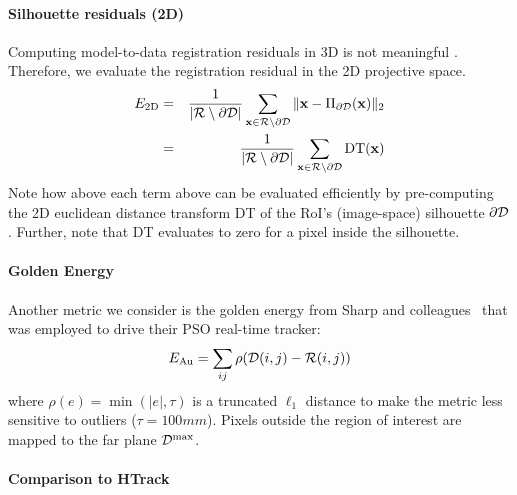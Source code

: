 \paragraph{Silhouette residuals (2D)}
Computing model-to-data registration residuals in 3D is not meaningful . Therefore, we evaluate the registration residual in the 2D projective space. 
\begin{eqnarray}
E_\text{2D} 
&=& \frac{1}{|\mathcal{R} \setminus \partial\mathcal{D}|} 
\sum_{\mathbf{x} \in \mathcal{R} \setminus \partial\mathcal{D}} \| \mathbf{x} - \Pi_{\partial\mathcal{D}}(\mathbf{x}) \|_2 \\ 
&=& \frac{1}{|\mathcal{R} \setminus \partial\mathcal{D}|} 
\sum_{\mathbf{x} \in \mathcal{R} \setminus \partial\mathcal{D}} \text{DT}(\mathbf{x})
\label{eq:metric2}
\end{eqnarray}
Note how above each term above can be evaluated efficiently by pre-computing the 2D euclidean distance transform DT of the RoI's (image-space) silhouette $\partial \mathcal{D}$. Further, note that DT evaluates to zero for a pixel inside the silhouette. 



\paragraph{Golden Energy}
Another metric we consider is the golden energy from Sharp and colleagues~ that was employed to drive their PSO real-time tracker:
\begin{equation}
E_{\text{Au}} = \sum_{ij} \rho(\mathcal{D}(i,j) - \mathcal{R}(i,j))
\label{eq:golden}
\end{equation}
where $\rho(e)=\min(|e|,\tau)$ is a truncated $\ell_1$ distance to make the metric less sensitive to outliers ($\tau=100mm$). Pixels outside the region of interest are mapped to the far plane $\mathcal{D}^\text{max}$.


\paragraph{Comparison to HTrack}
